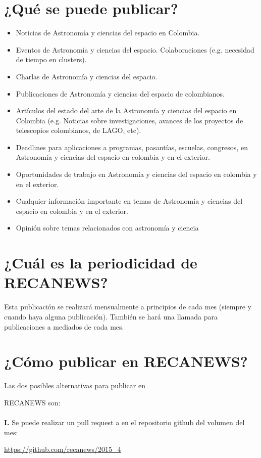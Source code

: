 \documentclass{book}
\begin{document}
\section*{¿Qué se puede publicar?}
\begin{itemize}
\item Noticias de Astronomía y ciencias del espacio en Colombia.
\item Eventos de Astronomía y ciencias del espacio.
Colaboraciones (e.g. necesidad de tiempo en clusters).
\item Charlas de Astronomía y ciencias del espacio.
\item Publicaciones de Astronomía y ciencias del espacio de colombianos.
\item Artículos del estado del arte de la Astronomía y ciencias del espacio en Colombia (e.g. Noticias sobre investigaciones, avances de los proyectos de telescopios colombianos, de LAGO, etc).
\item Deadlines para aplicaciones a programas, pasantías, escuelas, congresos, en Astronomía y ciencias del espacio  en colombia y en el exterior.
\item Oportunidades de trabajo en Astronomía y ciencias del espacio  en colombia y en el exterior.
\item Cualquier información importante en temas de Astronomía y ciencias del espacio  en colombia y en el exterior.
\item Opinión sobre temas relacionados con astronomía y ciencia
\end{itemize}


\section*{¿Cuál es la periodicidad de RECANEWS?}

Esta publicación se realizará mensualmente a principios de cada mes (siempre y cuando haya alguna publicación). También se hará una llamada para publicaciones a mediados de cada mes. 

\section*{¿Cómo publicar en RECANEWS?}
Las dos posibles alternativas para publicar en\par RECANEWS son:\\
\\
\textbf{I.} Se puede realizar un pull request a en el repositorio github del volumen del mes:
\begin{center}
 \url{https://github.com/recanews/2015_4}
\end{center}
\end{document}
